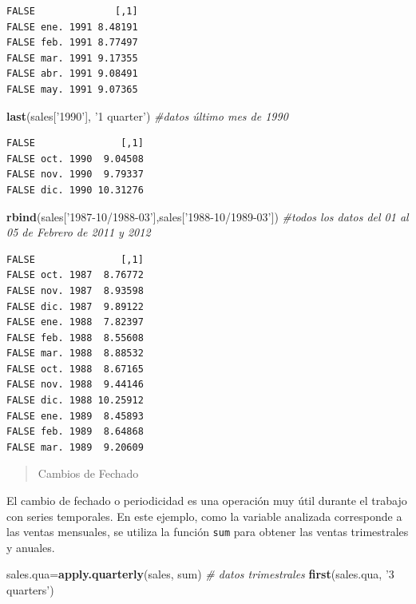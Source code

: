 \documentclass[]{book}
\newenvironment{Shaded}{\begin{snugshade}}{\end{snugshade}}
\newcommand{\CommentTok}[1]{\textcolor[rgb]{0.56,0.35,0.01}{\textit{#1}}}
\newcommand{\KeywordTok}[1]{\textcolor[rgb]{0.13,0.29,0.53}{\textbf{#1}}}
\newcommand{\NormalTok}[1]{#1}
\newcommand{\StringTok}[1]{\textcolor[rgb]{0.31,0.60,0.02}{#1}}
\begin{document}
\begin{verbatim}
FALSE              [,1]
FALSE ene. 1991 8.48191
FALSE feb. 1991 8.77497
FALSE mar. 1991 9.17355
FALSE abr. 1991 9.08491
FALSE may. 1991 9.07365
\end{verbatim}

\begin{Shaded}
\begin{Highlighting}[]
\KeywordTok{last}\NormalTok{(sales[}\StringTok{'1990'}\NormalTok{], }\StringTok{'1 quarter'}\NormalTok{) }\CommentTok{#datos último mes de 1990}
\end{Highlighting}
\end{Shaded}

\begin{verbatim}
FALSE               [,1]
FALSE oct. 1990  9.04508
FALSE nov. 1990  9.79337
FALSE dic. 1990 10.31276
\end{verbatim}

\begin{Shaded}
\begin{Highlighting}[]
\KeywordTok{rbind}\NormalTok{(sales[}\StringTok{'1987-10/1988-03'}\NormalTok{],sales[}\StringTok{'1988-10/1989-03'}\NormalTok{]) }\CommentTok{#todos los datos del 01 al 05 de Febrero de 2011 y 2012}
\end{Highlighting}
\end{Shaded}

\begin{verbatim}
FALSE               [,1]
FALSE oct. 1987  8.76772
FALSE nov. 1987  8.93598
FALSE dic. 1987  9.89122
FALSE ene. 1988  7.82397
FALSE feb. 1988  8.55608
FALSE mar. 1988  8.88532
FALSE oct. 1988  8.67165
FALSE nov. 1988  9.44146
FALSE dic. 1988 10.25912
FALSE ene. 1989  8.45893
FALSE feb. 1989  8.64868
FALSE mar. 1989  9.20609
\end{verbatim}

\begin{quote}
Cambios de Fechado
\end{quote}

El cambio de fechado o periodicidad es una operación muy útil durante el trabajo con series temporales. En este ejemplo, como la variable analizada corresponde a las ventas mensuales, se utiliza la función \texttt{sum} para obtener las ventas trimestrales y anuales.

\begin{Shaded}
\begin{Highlighting}[]
\NormalTok{sales.qua=}\KeywordTok{apply.quarterly}\NormalTok{(sales, sum) }\CommentTok{# datos trimestrales}
 \KeywordTok{first}\NormalTok{(sales.qua, }\StringTok{'3 quarters'}\NormalTok{)}
\end{Highlighting}
\end{Shaded}
\end{document}

